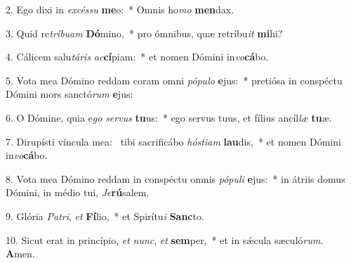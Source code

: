 2. Ego dixi in \textit{ex}\textit{cés}\textit{su} \textbf{me}o:~*  Omnis ho\textit{mo} \textbf{men}dax.\

3. Quid re\textit{trí}\textit{bu}\textit{am} \textbf{Dó}mino,~*  pro ómnibus, quæ retríbu\textit{it} \textbf{mi}hi?\

4. Cálicem salu\textit{tá}\textit{ris} \textit{ac}\textbf{cí}piam:~*  et nomen Dómini in\textit{vo}\textbf{cá}bo.\

5. Vota mea Dómino reddam coram omni \textit{pó}\textit{pu}\textit{lo} \textbf{e}jus:~*  pretiósa in conspéctu Dómini mors sanctó\textit{rum} \textbf{e}jus:\

6. O Dómine, quia e\textit{go} \textit{ser}\textit{vus} \textbf{tu}us:~*  ego servus tuus, et fílius ancíl\textit{læ} \textbf{tu}æ.\

7. Dirupísti víncula mea: \dag\  tibi sacrificábo \textit{hós}\textit{ti}\textit{am} \textbf{lau}dis,~*  et nomen Dómini in\textit{vo}\textbf{cá}bo.\

8. Vota mea Dómino reddam in conspéctu omnis \textit{pó}\textit{pu}\textit{li} \textbf{e}jus:~*  in átriis domus Dómini, in médio tui, \textit{Je}\textbf{rú}salem.\

9. Glória \textit{Pa}\textit{tri}, \textit{et} \textbf{Fí}lio,~*  et Spirítu\textit{i} \textbf{Sanc}to.\

10. Sicut erat in princípio, \textit{et} \textit{nunc}, \textit{et} \textbf{sem}per,~*  et in sǽcula sæculó\textit{rum}. \textbf{A}men.\

